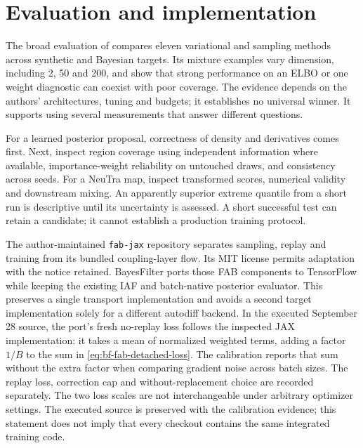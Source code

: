 



\section{Evaluation and implementation}
\label{sec:bf-is-evaluation}

The broad evaluation of \citet[Sections 7--8 and Appendices D--F]{blessing2024beyond}
compares eleven variational and sampling methods across synthetic and Bayesian
targets. Its mixture examples vary dimension, including 2, 50 and 200, and show
that strong performance on an ELBO or one weight diagnostic can coexist with
poor coverage. The evidence depends on the authors' architectures, tuning and
budgets; it establishes no universal winner. It supports using several
measurements that answer different questions.

For a learned posterior proposal, correctness of density and derivatives comes
first. Next, inspect region coverage using independent information where
available, importance-weight reliability on untouched draws, and consistency
across seeds. For a NeuTra map, inspect transformed scores, numerical validity
and downstream mixing. An apparently superior extreme quantile from a short
run is descriptive until its uncertainty is assessed. A short successful test
can retain a candidate; it cannot establish a production training protocol.

The author-maintained \texttt{fab-jax} repository separates sampling, replay
and training from its bundled coupling-layer flow. Its MIT license permits
adaptation with the notice retained. BayesFilter ports those FAB components to
TensorFlow while keeping the existing IAF and batch-native posterior evaluator.
This preserves a single transport implementation and avoids a second target
implementation solely for a different autodiff backend. In the executed
September 28 source, the port's fresh no-replay loss follows the inspected
JAX implementation: it takes a mean of normalized weighted terms, adding a
factor $1/B$ to the sum in \eqref{eq:bf-fab-detached-loss}. The calibration
reports that sum without the extra factor when comparing gradient noise
across batch sizes. The replay loss, correction cap and without-replacement
choice are recorded separately. The two loss scales are not interchangeable
under arbitrary optimizer settings. The executed source is preserved with
the calibration evidence; this statement does not imply that every checkout
contains the same integrated training code.

